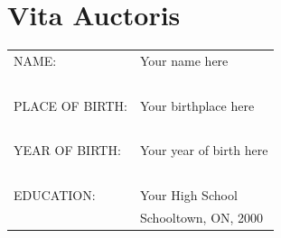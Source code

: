 \documentclass[11pt, oneside]{book} %
\begin{document}




\clearpage %

\chapter{Vita Auctoris}

\begin{tabular}{@{}ll}
  NAME:             & Your name here \\
  
  ~&~\\
  
  PLACE OF BIRTH:   & Your birthplace here \\
  
  ~&~\\
  
  YEAR OF BIRTH:    & Your year of birth here \\  
  
  ~&~\\
  
  EDUCATION:
  ~& Your High School \\
  ~& Schooltown, ON, 2000
    
\end{tabular}
\end{document}
